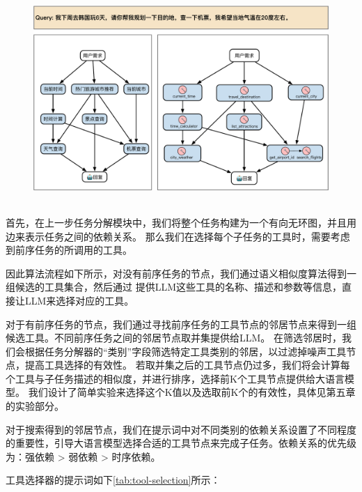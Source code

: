 \begin{figure}[!htp]
  \vspace{1em}
  \centering
  \setlength{\abovecaptionskip}{10pt} %
  \includegraphics[height=8cm]{../assets/ch4-工具选择器.pdf}
  \label{fig:ch4-dfs}
\end{figure}

首先，在上一步任务分解模块中，我们将整个任务构建为一个有向无环图，并且用边来表示任务之间的依赖关系。
那么我们在选择每个子任务的工具时，需要考虑到前序任务的所调用的工具。

因此算法流程如下所示，对没有前序任务的节点，我们通过语义相似度算法得到一组候选的工具集合，然后通过
提供LLM这些工具的名称、描述和参数等信息，直接让LLM来选择对应的工具。

对于有前序任务的节点，我们通过寻找前序任务的工具节点的邻居节点来得到一组候选工具。不同前序任务之间的邻居节点取并集提供给LLM。
在筛选邻居时，我们会根据任务分解器的“类别”字段筛选特定工具类别的邻居，以过滤掉噪声工具节点，提高工具选择的有效性。
若取并集之后的工具节点仍过多，我们将会计算每个工具与子任务描述的相似度，并进行排序，选择前K个工具节点提供给大语言模型。
我们设计了简单实验来选择这个K值以及选取前K个的有效性，具体见第五章的实验部分。

对于搜索得到的邻居节点，我们在提示词中对不同类别的依赖关系设置了不同程度的重要性，引导大语言模型选择合适的工具节点来完成子任务。依赖关系的优先级为：强依赖 > 弱依赖 > 时序依赖。

工具选择器的提示词如下\ref{tab:tool-selection}所示：


